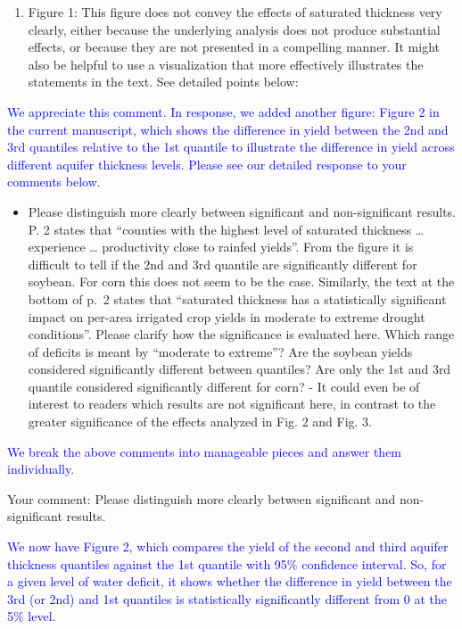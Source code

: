 \documentclass[
]{article}
\providecommand{\tightlist}{%
  \setlength{\itemsep}{0pt}\setlength{\parskip}{0pt}}
\begin{document}
\begin{enumerate}
\def\labelenumi{\arabic{enumi}.}
\tightlist
\item
  Figure 1: This figure does not convey the effects of saturated
  thickness very clearly, either because the underlying analysis does
  not produce substantial effects, or because they are not presented in
  a compelling manner. It might also be helpful to use a visualization
  that more effectively illustrates the statements in the text. See
  detailed points below:
\end{enumerate}

\textcolor{blue}{We appreciate this comment. In response, we added another figure: Figure 2 in the current manuscript, which shows the difference in yield between the 2nd and 3rd quantiles relative to the 1st quantile to illustrate the difference in yield across different aquifer thickness levels. Please see our detailed response to your comments below.}

\begin{itemize}
\tightlist
\item
  Please distinguish more clearly between significant and
  non-significant results. P. 2 states that ``counties with the highest
  level of saturated thickness \ldots{} experience \ldots{} productivity
  close to rainfed yields''. From the figure it is difficult to tell if
  the 2nd and 3rd quantile are significantly different for soybean. For
  corn this does not seem to be the case. Similarly, the text at the
  bottom of p.~2 states that ``saturated thickness has a statistically
  significant impact on per-area irrigated crop yields in moderate to
  extreme drought conditions''. Please clarify how the significance is
  evaluated here. Which range of deficits is meant by ``moderate to
  extreme''? Are the soybean yields considered significantly different
  between quantiles? Are only the 1st and 3rd quantile considered
  significantly different for corn? - It could even be of interest to
  readers which results are not significant here, in contrast to the
  greater significance of the effects analyzed in Fig. 2 and Fig. 3.
\end{itemize}

\textcolor{blue}{We break the above comments into manageable pieces and answer them individually.}

Your comment: Please distinguish more clearly between significant and
non-significant results.

\textcolor{blue}{
We now have Figure 2, which compares the yield of the second and third aquifer thickness quantiles against the 1st quantile with 95$\%$ confidence interval. So, for a given level of water deficit, it shows whether the difference in yield between the 3rd (or 2nd) and 1st quantiles is statistically significantly different from 0 at the 5$\%$ level.
}
\end{document}
